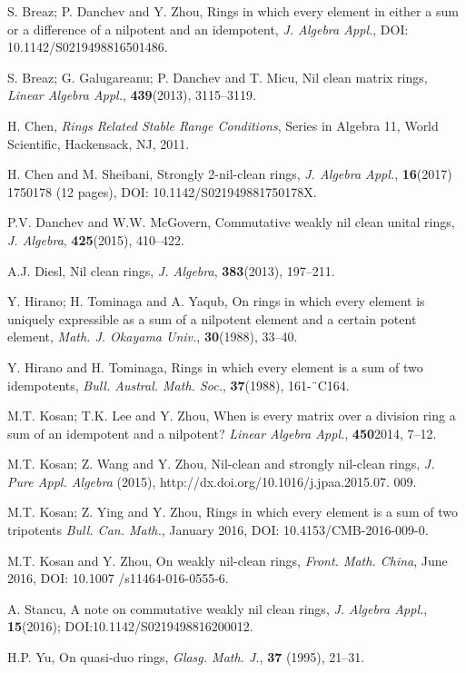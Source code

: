 \documentclass[12pt, reqno]{amsart}
\numberwithin{equation}{section}
\begin{document}
\vskip10mm\begin{thebibliography}{99}  S. Breaz; P. Danchev and Y.
Zhou, Rings in which every element in either a sum or a difference of a nilpotent and an idempotent, {\it J. Algebra Appl.}, DOI: 10.1142/S0219498816501486.

 S. Breaz; G. Galugareanu; P.
Danchev and T. Micu, Nil clean matrix rings, {\it Linear Algebra
Appl.}, {\bf 439}(2013), 3115--3119.

 H. Chen, {\it Rings Related
Stable Range Conditions}, Series in Algebra 11, World Scientific,
Hackensack, NJ, 2011.

 H. Chen and M. Sheibani, Strongly 2-nil-clean rings, {\it J. Algebra Appl.},
{\bf 16}(2017) 1750178 (12 pages), DOI: 10.1142/S021949881750178X.

 P.V. Danchev and W.W. McGovern,
Commutative weakly nil clean unital rings, {\it J. Algebra}, {\bf 425}(2015), 410--422.

A.J. Diesl, Nil clean rings,
 {\it J. Algebra}, {\bf 383}(2013), 197--211.

 Y. Hirano; H. Tominaga and A.
Yaqub, On rings in which every element is uniquely expressible as
a sum of a nilpotent element and a certain potent element, {\it
Math. J. Okayama Univ.}, {\bf{30}}(1988), 33--40.

 Y. Hirano and H. Tominaga,
Rings in which every element is a sum of two
idempotents, {\it Bull. Austral. Math. Soc.}, {\bf 37}(1988), 161-¨C164.

 M.T. Kosan; T.K. Lee and Y.
Zhou, When is every matrix over a division ring a sum of an
idempotent and a nilpotent? {\it Linear Algebra Appl.}, {\bf
450}{2014}, 7--12.

 M.T. Kosan; Z. Wang and Y. Zhou, Nil-clean and strongly nil-clean rings, {\it J. Pure Appl. Algebra} (2015),
http://dx.doi.org/10.1016/j.jpaa.2015.07. 009.

 M.T. Kosan; Z. Ying and Y. Zhou, Rings in which every element is a sum of two tripotents
{\it Bull. Can. Math.}, January 2016, DOI: 10.4153/CMB-2016-009-0.

 M.T. Kosan and Y. Zhou, On weakly nil-clean rings, {\it Front. Math. China}, June 2016, DOI: 10.1007 /s11464-016-0555-6.

 A. Stancu, A note on commutative weakly nil clean rings,
 {\it J. Algebra Appl.}, {\bf 15}(2016); DOI:10.1142/S0219498816200012.

 H.P. Yu, On quasi-duo rings, {\it Glasg. Math. J.}, {\bf
37} (1995), 21--31.
\end{thebibliography}
\end{document}

